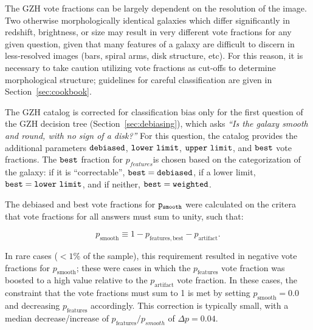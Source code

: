 \documentclass[twocolumn]{aastex6}
\begin{document}
The GZH vote fractions can be largely dependent on the resolution of the image. Two otherwise morphologically identical galaxies which differ significantly in redshift, brightness, or size may result in very different vote fractions for any given question, given that many features of a galaxy are difficult to discern in less-resolved images (bars, spiral arms, disk structure, etc). For this reason, it is necessary to take caution utilizing vote fractions as cut-offs to determine morphological structure; guidelines for careful classification are given in Section~\ref{sec:cookbook}. 

The GZH catalog is corrected for classification bias only for the first question of the GZH decision tree (Section~\ref{sec:debiasing}), which asks {\it ``Is the galaxy smooth and round, with no sign of a disk?''} For this question, the catalog provides the additional parameters $\tt debiased$, $\tt lower~limit$, $\tt upper~limit$, and $\tt best$ vote fractions. The $\tt best$ fraction for $p_{features}$is chosen based on the categorization of the galaxy: if it is ``correctable'', $\tt best = debiased$, if a lower limit, $\tt best = lower~limit$, and if neither, $\tt best = weighted$. 

The debiased and best vote fractions for $\tt p_{smooth}$ were calculated on the critera that vote fractions for all answers must sum to unity, such that:

\begin{equation}
p_\mathrm{smooth} \equiv 1 - p_\mathrm{features,best} - p_\mathrm{artifact}.
\label{eqn:nonlinear}
\end{equation}

\noindent In rare cases ($<1\%$ of the sample), this requirement resulted in negative vote fractions for $p_\mathrm{smooth}$; these were cases in which the $p_\mathrm{features}$ vote fraction was boosted to a high value relative to the $p_\mathrm{artifact}$ vote fraction. In these cases, the constraint that the vote fractions must sum to 1 is met by setting $p_\mathrm{smooth}=0.0$ and decreasing $p_\mathrm{features}$ accordingly. This correction is typically small, with a median decrease/increase of $p_\mathrm{features}/p_{smooth}$ of $\Delta p = 0.04$.
\end{document}
